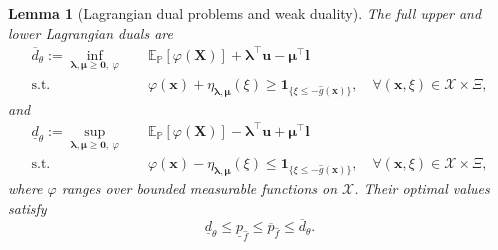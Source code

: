 \documentclass[review,11pt,3p,authoryear,nopreprintline]{elsarticle}
\newtheorem{lemma}{Lemma}
\begin{document}
\begin{lemma}[Lagrangian dual problems and weak duality]
  \label{lem-weak-duality}
  The full upper and lower Lagrangian duals are
  \begin{equation}
    \begin{aligned}
      \overline d_\theta
      :=\inf_{\bm\lambda,\bm\mu\ge\bm 0,\ \varphi}\quad&
        \mathbb E_{\mathbb P}[\varphi(\bm X)]
        +\bm\lambda^\top\bm u-\bm\mu^\top\bm l\\
      \text{s.t.}\quad&
        \varphi(\bm x)+\eta_{\bm\lambda,\bm\mu}(\xi)
        \ge\mathbf1_{\{\xi\le -\hat g(\bm x)\}},
        \quad\forall(\bm x,\xi)\in\mathcal X\times\Xi,
    \end{aligned}
    \label{eq-upper-measure-dual}
  \end{equation}
  and
  \begin{equation}
    \begin{aligned}
      \underline d_\theta
      :=\sup_{\bm\lambda,\bm\mu\ge\bm 0,\ \varphi}\quad&
        \mathbb E_{\mathbb P}[\varphi(\bm X)]
        -\bm\lambda^\top\bm u+\bm\mu^\top\bm l\\
      \text{s.t.}\quad&
        \varphi(\bm x)-\eta_{\bm\lambda,\bm\mu}(\xi)
        \le\mathbf1_{\{\xi\le -\hat g(\bm x)\}},
        \quad\forall(\bm x,\xi)\in\mathcal X\times\Xi,
    \end{aligned}
    \label{eq-lower-measure-dual}
  \end{equation}
  where $\varphi$ ranges over bounded measurable functions on $\mathcal X$. Their optimal values satisfy
  \begin{equation}
    \underline d_\theta
    \le\underline p_{\hat f}\le\overline p_{\hat f}
    \le\overline d_\theta.
    \label{eq-weak-duality}
  \end{equation}
\end{lemma}
\end{document}
